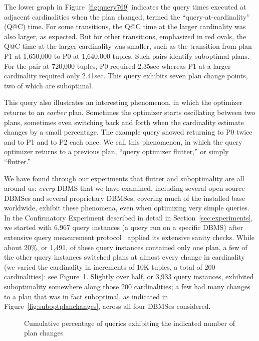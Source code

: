 \documentclass[prodmode,acmtods]{acmsmall}
\begin{document}
The lower graph in Figure~\ref{fig:query769} indicates the query times
executed at adjacent cardinalities when the plan changed, termed the
``query-at-cardinality'' (Q@C) time. For some transitions, the Q@C time at
the larger cardinality was also larger, as expected. But for other
transitions, emphasized in red ovals, the Q@C time at the larger cardinality
was smaller, such as the transition from plan P1 at 1,650,000 to P0 at 1,640,000
tuples. Such pairs identify suboptimal plans. For the pair at 720,000
tuples, P0 required 2.35sec whereas P1 at a larger cardinality required only
2.41sec. This query exhibits seven plan change points, two of which are suboptimal.

This query also illustrates an interesting phenomenon, in which the
optimizer returns to an {\em earlier} plan. Sometimes the
optimizer starts oscillating between two plans, sometimes even switching
back and forth when the cardinality estimate changes by a small
percentage. The example query showed returning to P0 twice and to P1 and to
P2 each once.
We call this phenomenon, in which
the query optimizer returns to a previous plan,
``query optimizer flutter,'' or simply ``flutter.'' 

We have found through our experiments that flutter and suboptimality are all
around us: {\em every} \hbox{DBMS} that we have examined, including several
open source \hbox{DBMSes} and several proprietary
\hbox{DBMSes}, covering much of the installed base worldwide, exhibit these
phenomena, even when optimizing very simple queries. In the Confirmatory
Experiment described in detail in Section~\ref{sec:experiments}, we started
with 6,967 query instances (a query run on a specific \hbox{DBMS}) after  extensive query measurement
protocol~\cite{TTPv1,TTPv2} applied its extensive sanity checks. While about
20\%, or 1,491, of these query instances contained only one
plan, a few of the other query instances switched plans at almost every change in cardinality (we varied the
cardinality in increments of 10K tuples, a total of 200 cardinalities): see
Figure~\ref{fig:planchanges}. Slightly over half, or 3,933 query instances, exhibited
suboptimality somewhere along those 200 cardinalities; a few had
many changes to a plan that was in fact suboptimal, as indicated in
Figure~\ref{fig:suboptplanchanges}, across all four \hbox{DBMSes} considered.

\begin{figure}[h!]\centering
\caption{Cumulative percentage of queries \hbox{exhibiting} the \hbox{indicated}
  number of plan changes\label{fig:planchanges}}
\end{figure}
\end{document}
